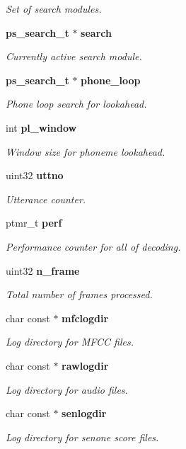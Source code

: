 \begin{DoxyCompactItemize}
\begin{DoxyCompactList}\small\item\em Set of search modules. \end{DoxyCompactList}\item 
\textbf{ ps\+\_\+search\+\_\+t} $\ast$ \textbf{ search}
\begin{DoxyCompactList}\small\item\em Currently active search module. \end{DoxyCompactList}\item 
\textbf{ ps\+\_\+search\+\_\+t} $\ast$ \textbf{ phone\+\_\+loop}
\begin{DoxyCompactList}\small\item\em Phone loop search for lookahead. \end{DoxyCompactList}\item 
int \textbf{ pl\+\_\+window}
\begin{DoxyCompactList}\small\item\em Window size for phoneme lookahead. \end{DoxyCompactList}\item 
uint32 \textbf{ uttno}
\begin{DoxyCompactList}\small\item\em Utterance counter. \end{DoxyCompactList}\item 
ptmr\+\_\+t \textbf{ perf}
\begin{DoxyCompactList}\small\item\em Performance counter for all of decoding. \end{DoxyCompactList}\item 
uint32 \textbf{ n\+\_\+frame}
\begin{DoxyCompactList}\small\item\em Total number of frames processed. \end{DoxyCompactList}\item 
char const  $\ast$ \textbf{ mfclogdir}
\begin{DoxyCompactList}\small\item\em Log directory for M\+F\+CC files. \end{DoxyCompactList}\item 
char const  $\ast$ \textbf{ rawlogdir}
\begin{DoxyCompactList}\small\item\em Log directory for audio files. \end{DoxyCompactList}\item 
char const  $\ast$ \textbf{ senlogdir}
\begin{DoxyCompactList}\small\item\em Log directory for senone score files. \end{DoxyCompactList}\end{DoxyCompactItemize}


